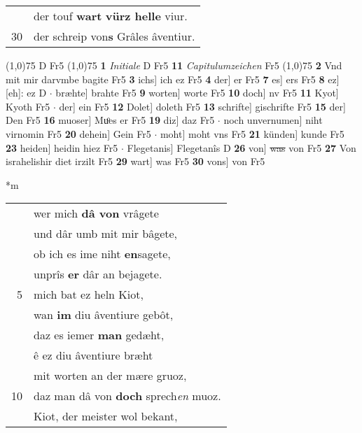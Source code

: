 \documentclass[8pt,a4paper,notitlepage]{article}
\begin{document}
\begin{table}[ht]
\begin{minipage}[t]{0.5\linewidth}
\begin{tabular}{rl}
 & der touf \textbf{wart} \textbf{vürz helle} viur.\\ 
30 & der schreip von\textbf{s} Grâles âventiur.\\ 
\end{tabular}
\scriptsize
\line(1,0){75} \newline
D Fr5 \newline
\line(1,0){75} \newline
\textbf{1} \textit{Initiale} D Fr5  \textbf{11} \textit{Capitulumzeichen} Fr5  \newline
\line(1,0){75} \newline
\textbf{2} Vnd mit mir darvmbe bagite Fr5 \textbf{3} ichs] ich ez Fr5 \textbf{4} der] er Fr5 \textbf{7} es] ers Fr5 \textbf{8} ez] [eh]: ez D  $\cdot$ bræhte] brahte Fr5 \textbf{9} worten] worte Fr5 \textbf{10} doch] nv Fr5 \textbf{11} Kyot] Kyoth Fr5  $\cdot$ der] ein Fr5 \textbf{12} Dolet] doleth Fr5 \textbf{13} schrifte] gischrifte Fr5 \textbf{15} der] Den Fr5 \textbf{16} muoser] Muͦes er Fr5 \textbf{19} diz] daz Fr5  $\cdot$ noch unvernumen] niht virnomin Fr5 \textbf{20} dehein] Gein Fr5  $\cdot$ moht] moht vns Fr5 \textbf{21} künden] kunde Fr5 \textbf{23} heiden] heidin hiez Fr5  $\cdot$ Flegetanis] Flegetanîs D \textbf{26} von] \sout{was} von Fr5 \textbf{27} Von israhelishir diet irzilt Fr5 \textbf{29} wart] was Fr5 \textbf{30} vons] von Fr5 \newline
\end{minipage}
\hspace{0.5cm}
\begin{minipage}[t]{0.5\linewidth}
\small
\begin{center}*m
\end{center}
\begin{tabular}{rl}
 & wer mich \textbf{dâ von} vrâgete\\ 
 & und dâr umb mit mir bâgete,\\ 
 & ob ich es ime niht \textbf{en}sagete,\\ 
 & unprîs \textbf{er} dâr an bejagete.\\ 
5 & mich bat ez heln Kiot,\\ 
 & wan \textbf{im} diu âventiure gebôt,\\ 
 & daz es iemer \textbf{man} gedæht,\\ 
 & ê ez diu âventiure bræht\\ 
 & mit worten an der mære gruoz,\\ 
10 & daz man dâ von \textbf{doch} sprech\textit{en} muoz.\\ 
 & Kiot, der meister wol bekant,\\ 

\end{tabular}
\end{minipage}
\end{table}
\end{document}
